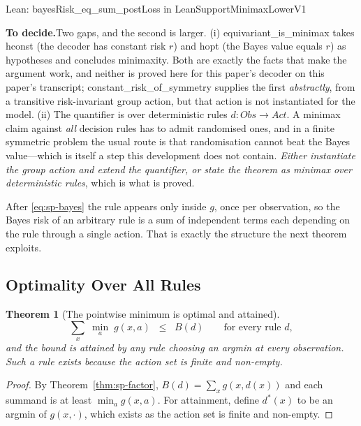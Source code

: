 \documentclass[conference]{IEEEtran}
\newtheorem{theorem}{Theorem}
\theoremstyle{definition}
\newcommand{\lean}[1]{\textsf{\footnotesize #1}}
\newcommand{\leanbox}[1]{%
  \par\vspace{2pt}\noindent
  {\footnotesize\textsf{Lean: #1}}\par\vspace{2pt}}
\newif\ifshownotes\shownotestrue
\newcommand{\TODOPAR}[1]{\ifshownotes\par\vspace{2pt}\noindent%
  {\color{todocol}\textsf{\footnotesize\textbf{To decide.}\;#1}}\par\vspace{2pt}\fi}
\begin{document}
\leanbox{\lean{bayesRisk\_eq\_sum\_postLoss} in \lean{LeanSupportMinimaxLowerV1}}
\TODOPAR{Two gaps, and the second is larger. (i) \lean{equivariant\_is\_minimax} takes
\lean{hconst} (the decoder has constant risk $r$) and \lean{hopt} (the Bayes value equals
$r$) as hypotheses and concludes minimaxity. Both are exactly the facts that make the
argument work, and neither is proved here for this paper's decoder on this paper's
transcript; \lean{constant\_risk\_of\_symmetry} supplies the first \emph{abstractly}, from a
transitive risk-invariant group action, but that action is not instantiated for the model.
(ii) The quantifier is over deterministic rules $d:\mathit{Obs}\to\mathit{Act}$. A minimax
claim against \emph{all} decision rules has to admit randomised ones, and in a finite
symmetric problem the usual route is that randomisation cannot beat the Bayes value---which
is itself a step this development does not contain. \emph{Either instantiate the group action
and extend the quantifier, or state the theorem as minimax over deterministic rules}, which
is what is proved.}

After \eqref{eq:sp-bayes} the rule appears only inside $g$, once per observation, so the Bayes
risk of an arbitrary rule is a sum of independent terms each depending on the rule through a
single action. That is exactly the structure the next theorem exploits.

\subsection{Optimality Over All Rules}
\label{sec:sp-minimax}

\begin{theorem}[The pointwise minimum is optimal and attained]
\label{thm:sp-optimal}
\begin{equation}
\sum_{x}\;\min_{a}\;g(x,a)\;\;\leq\;\;B(d)
\qquad\text{for every rule } d,
\label{eq:sp-optimal}
\end{equation}
and the bound is attained by any rule choosing an argmin at every observation. Such a rule
exists because the action set is finite and non-empty.
\end{theorem}

\begin{proof}
By Theorem~\ref{thm:sp-factor}, $B(d)=\sum_{x}g(x,d(x))$ and each summand is at least
$\min_{a}g(x,a)$. For attainment, define $d^{*}(x)$ to be an argmin of $g(x,\cdot)$, which
exists as the action set is finite and non-empty.
\end{proof}
\end{document}
